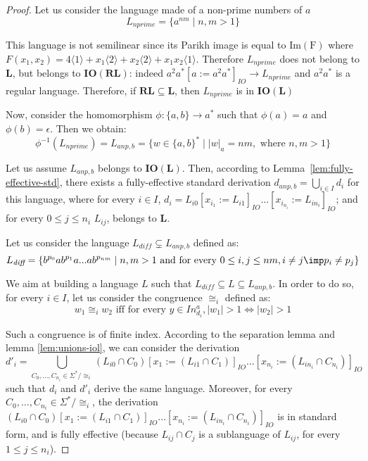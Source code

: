 \begin{proof}
  Let us consider the language made of a non-prime numbers of $a$
  $$L_{nprime} = \{a^{nm} \mid n,m>1\}$$

  This language is not semilinear since its Parikh image is equal to $\mathrm{Im(F)}$ where $F(x_1, x_2)=4\langle 1 \rangle + x_1\langle 2\rangle + x_2\langle 2\rangle + x_1x_2\langle 1 \rangle$.
  Therefore $L_{nprime}$ does not belong to $\mathbf{L}$, but belongs to $\mathbf{IO(RL)}$: indeed $a^2a^\ast[a:=a^2a^\ast]_{IO} \rightarrow L_{nprime}$ and $a^2a^\ast$ is a regular language. Therefore, if $\mathbf{RL} \subseteq \mathbf{L}$, then $L_{nprime}$ is in $\mathbf{IO(L)}$

  Now, consider the homomorphism $\phi:\{a, b\} \to a^\ast$ such that $\phi(a)=a$ and $\phi(b)=\epsilon$. Then we obtain:
  $$\phi^{-1}(L_{nprime}) = L_{anp,b} = \{w \in \{a, b\}^\ast \mid |w|_a=nm, \text{ where }n,m > 1\}$$
  
  Let us assume $L_{anp, b}$ belongs to $\mathbf{IO(L)}$.
  Then, according to Lemma~\ref{lem:fully-effective-std}, there exists a fully-effective standard derivation $d_{anp,b}=\bigcup_{i \in I}d_i$ for this language,  where for every $i \in I$, $d_i=L_{i0}[x_{i_1}:=L_{i1}]_{IO} \dots [x_{i_{n_i}}:=L_{in_i}]_{IO}$; and for every $0 \leq j \leq n_i$  $L_{ij}$, belongs to $\mathbf{L}$.

  Let us consider the language $L_{\textit{diff}} \subsetneq L_{anp, b}$ defined as:
  $$L_{\textit{diff}} = \{b^{p_0}ab^{p_1}a...ab^{p_{nm}} \mid n,m > 1 \text{ and for every }  0 \leq i,j \leq nm, i \neq j \imp p_i \neq p_j\}$$

We aim at building a language $L$ such that $L_{\textit{diff}} \subseteq L \subseteq L_{anp,b}$. In order to do so, for every $i \in I$, let us consider the congruence $\cong_i$ defined as:
$$w_1 \cong_i w_2 \text{ iff for every }y \in {In_{d_i}^a}, |w_1|>1 \iff |w_2|>1$$

Such a congruence is of finite index. According to the separation lemma and lemma \ref{lem:unions-iol}, we can consider the derivation
$$d'_i = \bigcup_{C_0, \dots, C_{n_i} \in \Sigma^\ast/{\cong_i}} (L_{i0} \cap C_0)[x_1 := (L_{i1} \cap C_1)]_{IO} \dots [x_{n_i} := (L_{in_i} \cap C_{n_i})]_{IO}$$
such that $d_i$ and $d'_i$ derive the same language. Moreover, for every $C_0, \dots, C_{n_i} \in \Sigma^\ast/{\cong_i}$, the derivation $(L_{i0} \cap C_0)[x_1 := (L_{i1} \cap C_1)]_{IO} \dots [x_{n_i} := (L_{in_i} \cap C_{n_i})]_{IO}$ is in standard form, and is fully effective (because $L_{ij} \cap C_j$ is a sublanguage of $L_{ij}$, for every $1 \leq j \leq n_i$).


\end{proof}
